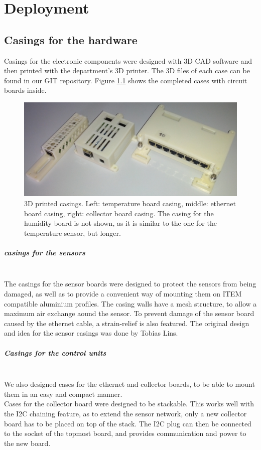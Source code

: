 \documentclass[a4paper]{scrreprt}
\begin{document}
\chapter{Deployment}
\section{Casings for the hardware}
Casings for the electronic components were designed with 3D CAD software and then printed with the department's 3D printer. The 3D
files of each case can be found in our GIT repository. Figure \ref{fig:casings} shows the completed cases with circuit boards inside.
\begin{figure}[Hh!]
	\centering
	\includegraphics[width=\textwidth]{img/cases.jpg}
  \caption{3D printed casings. Left: temperature board casing, middle: ethernet board casing, right: collector board casing. The casing for the humidity board is not shown, as it is similar to the one for the temperature sensor, but longer.}
	\label{fig:casings}
\end{figure}
\paragraph{casings for the sensors}\hspace{1cm}\\
The casings for the sensor boards were designed to protect the sensors from being damaged, as well as to provide a convenient way of
mounting them on ITEM compatible aluminium profiles. The casing walls have a mesh structure, to allow a maximum air exchange aound the
sensor. To prevent damage of the sensor board caused by the ethernet cable, a strain-relief is also featured. The original design and
idea for the sensor casings was done by Tobias Lins.
\paragraph{Casings for the control units}\hspace{1cm}\\
We also designed cases for the ethernet and collector boards, to be able to mount them in an easy and compact manner.\\
Cases for the collector board were designed to be stackable. This works well with the I2C chaining feature, as to extend the sensor network,
only a new collector board has to be placed on top of the stack. The I2C plug can then be connected to the socket of the topmost board, and provides
communication and power to the new board.
\end{document}
